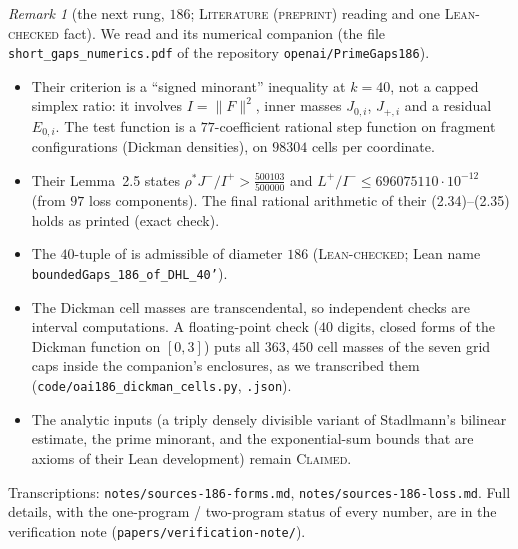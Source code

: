\documentclass[11pt]{amsart}
\theoremstyle{definition}
\theoremstyle{remark}
\newtheorem{remark}[theorem]{Remark}
\newcommand{\lbl}[1]{\textup{\textsc{#1}}}
\begin{document}
\begin{remark}[the next rung, $186$; \lbl{Literature (preprint)} reading and one \lbl{Lean-checked} fact]\label{rem:oai186}
We read \cite{OAI26} and its numerical companion (the file
\texttt{short\_gaps\_numerics.pdf} of the repository \texttt{openai/PrimeGaps186}).
\begin{itemize}
\item Their criterion \cite[Theorem~4.5]{OAI26} is a ``signed minorant''
  inequality at $k=40$, not a capped simplex ratio: it involves $I=\|F\|^2$,
  inner masses $J_{0,i}$, $J_{+,i}$ and a residual $E_{0,i}$. The test function
  is a $77$-coefficient rational step function on fragment configurations
  (Dickman densities), on $98304$ cells per coordinate.
\item Their Lemma~2.5 states $\rho^*J^-/I^+>\frac{500103}{500000}$ and
  $L^+/I^-\le696075110\cdot10^{-12}$ (from $97$ loss components). The final
  rational arithmetic of their (2.34)--(2.35) holds as printed (exact check).
\item The $40$-tuple of \cite[(1.3)]{OAI26} is admissible of diameter
  $186$ (\lbl{Lean-checked}; Lean name
  \texttt{boundedGaps\_186\_}\allowbreak\texttt{of\_DHL\_40'}).
\item The Dickman cell masses are transcendental, so independent checks are
  interval computations. A floating-point check ($40$ digits, closed forms of the
  Dickman function on $[0,3]$) puts all $363{,}450$ cell masses of the seven
  grid caps inside the companion's enclosures, as we transcribed them
  (\texttt{code/oai186\_dickman\_cells.py}, \texttt{.json}).
\item The analytic inputs (a triply densely divisible variant of Stadlmann's
  bilinear estimate, the prime minorant, and the exponential-sum bounds that are
  axioms of their Lean development) remain \lbl{Claimed}.
\end{itemize}
Transcriptions: \texttt{notes/sources-186-forms.md},
\texttt{notes/sources-186-loss.md}. Full details, with the one-program /
two-program status of every number, are in the verification note
(\texttt{papers/verification-note/}).
\end{remark}
\end{document}
